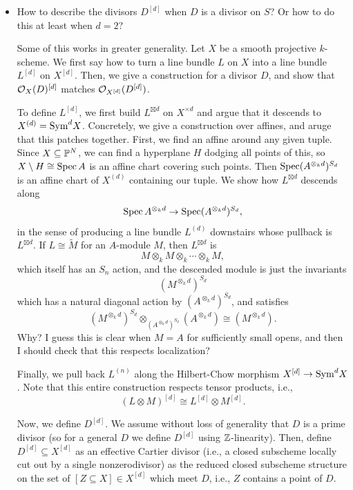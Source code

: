 \documentclass[12pt]{article}
\begin{document}
\begin{itemize}
    \item {\color{blue} How to describe the divisors $D^{[d]}$ when $D$ is a divisor on $S$? Or how to do this at least when $d=2$?}
    
    Some of this works in greater generality. Let $X$ be a smooth projective $k$-scheme. We first say how to turn a line bundle $L$ on $X$ into a line bundle $L^{[d]}$ on $X^{[d]}$. Then, we give a construction for a divisor $D$, and show that $\cO_X(D)^{[d]}$ matches $\cO_{X^{[d]}}(D^{[d]})$.
    
    To define $L^{[d]}$, we first build $L^{\boxtimes d}$ on $X^{\times d}$ and argue that it descends to $X^{(d)}=\Sym^d X$. Concretely, we give a construction over affines, and aruge that this patches together. First, we find an affine around any given tuple. Since $X\subseteq \P^N$, we can find a hyperplane $H$ dodging all points of this, so $X\setminus H \cong \Spec A$ is an affine chart covering such points. Then $\Spec (A^{\otimes_k d})^{S_d}$ is an affine chart of $X^{(d)}$ containing our tuple. We show how $L^{\boxtimes d}$ descends along
    \[\Spec A^{\otimes_k d} \to \Spec (A^{\otimes_k d})^{S_d},\]
    in the sense of producing a line bundle $L^{(d)}$ downstairs whose pullback is $L^{\boxtimes d}$. If $L \cong \tilde{M}$ for an $A$-module $M$, then $L^{\boxtimes d}$ is
    \[M \otimes_k M \otimes_k \cdots \otimes_k M,\]
    which itself has an $S_n$ action, and the descended module is just the invariants
    \[(M^{\otimes_k d})^{S_d}\]
    which has a natural diagonal action by $(A^{\otimes_k d})^{S_d}$, and satisfies
    \[(M^{\otimes_k d})^{S_d} \otimes_{(A^{\otimes_k d})^{S_d}} (A^{\otimes_k d}) \cong (M^{\otimes_k d}).\]
    {\color{red} Why? I guess this is clear when $M=A$ for sufficiently small opens, and then I should check that this respects localization?}
    
    Finally, we pull back $L^{(n)}$ along the Hilbert-Chow morphism $X^{[d]} \to \Sym^d X$. Note that this entire construction respects tensor products, i.e.,
    \[(L\otimes M)^{[d]} \cong L^{[d]} \otimes M^{[d]}.\]

    Now, we define $D^{[d]}$. We assume without loss of generality that $D$ is a prime divisor (so for a general $D$ we define $D^{[d]}$ using $\Z$-linearity). Then, define $D^{[d]}\subseteq X^{[d]}$ as an effective Cartier divisor (i.e., a closed subscheme locally cut out by a single nonzerodivisor) as the reduced closed subscheme structure on the set of $[Z\subseteq X] \in X^{[d]}$ which meet $D$, i.e., $Z$ contains a point of $D$.


\end{itemize}
\end{document}
